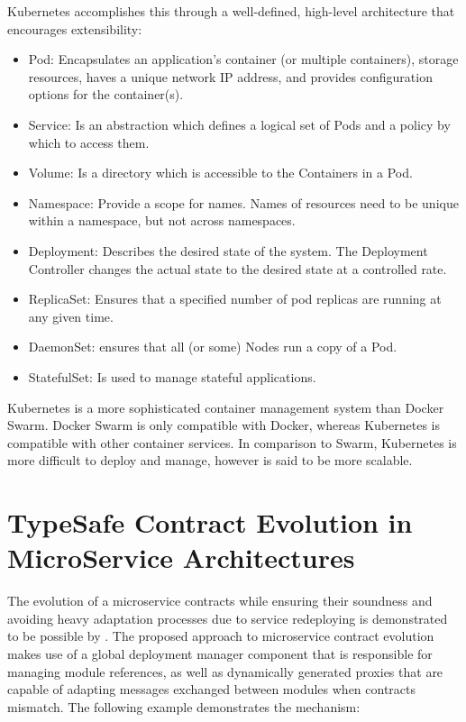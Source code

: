 Kubernetes accomplishes this through a well-defined, high-level architecture that encourages extensibility:

\begin{itemize}
    \item Pod: Encapsulates an application's container (or multiple containers),
    storage resources, haves a unique network IP address, and provides configuration options for the container(s).
    \item Service: Is an abstraction which defines a logical set
    of Pods and a policy by which to access them.
    \item Volume: Is a directory which is accessible to the
    Containers in a Pod.
    \item Namespace: Provide a scope for names. Names
    of resources need to be unique within a namespace, but not
    across namespaces.
    \item Deployment: Describes the desired state of the system. The
    Deployment Controller changes the actual state to the desired
    state at a controlled rate.
    \item ReplicaSet: Ensures that a specified number of pod replicas
    are running at any given time.
    \item DaemonSet: ensures that all (or some) Nodes run a copy of
    a Pod.
    \item StatefulSet: Is used to manage stateful applications.
\end{itemize}

Kubernetes is a more sophisticated container management system than Docker Swarm.
Docker Swarm is only compatible with Docker, whereas Kubernetes is compatible with other container services.
In comparison to Swarm, Kubernetes is more difficult to deploy and manage, however is said to be more scalable.

\section{TypeSafe Contract Evolution in MicroService Architectures} %
\label{sec:typesafe_contract_evolution_in_microservice_architectures}

The evolution of a microservice contracts while ensuring their soundness and
avoiding heavy adaptation processes due to service redeploying is demonstrated to be possible by \citeauthor{seco2020robust} \cite{seco2020robust}.
The proposed approach to microservice contract evolution \cite{seco2020robust} makes use of a global deployment manager component that is responsible for managing module references,
as well as dynamically generated proxies that are capable of adapting messages exchanged between modules when contracts mismatch.
The following example demonstrates the mechanism:

